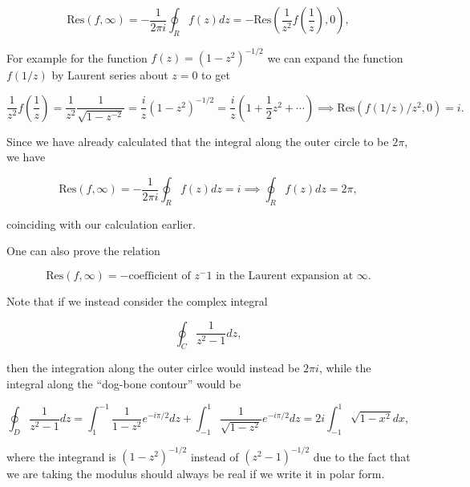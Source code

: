 \documentclass[english,a4paper,12pt]{report}
\begin{document}
{\begin{equation}
    \text{Res}(f,\infty) = -\frac{1}{2\pi i} \oint_{R} f(z)dz = -\text{Res}\left( \frac{1}{z^2}f\left( \frac{1}{z}  \right),0  \right),
\end{equation}

For example for the function \(f(z) = (1-z^2)^{-1/2} \) we can expand the function \(f(1/z)\) by Laurent series about \(z = 0\) to get   

\begin{equation}
    \frac{1}{z^2} f\left( \frac{1}{z}  \right) = \frac{1}{z^2}\frac{1}{\sqrt{1-z^{-2} } } = \frac{i}{z} (1-z^2)^{-1/2} = \frac{i}{z} \left(1+ \frac{1}{2}z^2 + \cdots  \right) \implies \text{Res}(f(1/z)/z^2, 0) = i.    
\end{equation}

Since we have already calculated that the integral along the outer circle to be \(2\pi \), we have 

\begin{equation}
    \text{Res}(f,\infty) = -\frac{1}{2\pi i} \oint_{R} f(z)dz = i \implies \oint_{R} f(z)dz = 2\pi ,
\end{equation}

coinciding with our calculation earlier.

One can also prove the relation 

\begin{equation}
    \text{Res}(f,\infty)  = -\text{coefficient of \(z^-1\) in the Laurent expansion at \(\infty\)}. 
\end{equation}

Note that if we instead consider the complex integral 

\begin{equation}
    \oint_{C} \frac{1}{z^2-1}dz, 
\end{equation}

then the integration along the outer cirlce would instead be \(2\pi i\), while the integral along the ``dog-bone contour'' would be 

\begin{equation}
    \oint_{D} \frac{1}{z^2-1}dz = \int_{1}^{-1} \frac{1}{1-z^2}e^{-i\pi /2} dz + \int_{-1}^{1} \frac{1}{\sqrt{1-z^2} } e^{-i\pi /2}dz = 2i \int_{-1}^{1} \sqrt{1-x^2}dx,          
\end{equation}

where the integrand is \((1-z^2)^{-1/2} \) instead of \((z^2-1)^{-1/2} \) due to the fact that we are taking the modulus should always be real if we write it in polar form.  
}
\end{document}
